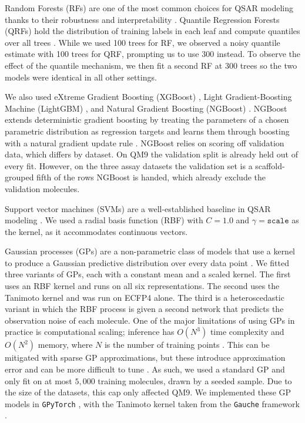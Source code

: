 Random Forests (RFs) are one of the most common choices for QSAR modeling thanks to their robustness and interpretability \citep{Svetnik2003}. Quantile Regression Forests (QRFs) hold the distribution of training labels in each leaf and compute quantiles over all trees \citep{Meinshausen2006}. While we used 100 trees for RF, we observed a noisy quantile estimate with 100 trees for QRF, prompting us to use 300 instead. To observe the effect of the quantile mechanism, we then fit a second RF at 300 trees so the two models were identical in all other settings. 

We also used eXtreme Gradient Boosting (XGBoost) \citep{Chen2016}, Light Gradient-Boosting Machine (LightGBM) \citep{ke2017lightgbm}, and Natural Gradient Boosting (NGBoost) \citep{Duan2020}. NGBoost extends deterministic gradient boosting by treating the parameters of a chosen parametric distribution as regression targets and learns them through boosting with a natural gradient update rule \citep{Duan2020}. NGBoost relies on scoring off validation data, which differs by dataset. On QM9 the validation split is already held out of every fit. However, on the three assay datasets the validation set is a scaffold-grouped fifth of the rows NGBoost is handed, which already exclude the validation molecules. 

Support vector machines (SVMs) are a well-established baseline in QSAR modeling \citep{Vapnik1995, Svetnik2003}. We used a radial basis function (RBF) with $C = 1.0$ and $\gamma = \texttt{scale}$ as the kernel, as it accommodates continuous vectors. 

Gaussian processes (GPs) are a non-parametric class of models that use a kernel to produce a Gaussian predictive distribution over every data point \citep{Obrezanova2007, Rasmussen2005}. We fitted three variants of GPs, each with a constant mean and a scaled kernel. The first uses an RBF kernel and runs on all six representations. The second uses the Tanimoto kernel \citep{Ralaivola2005, moss2020} and was run on ECFP4 alone. The third is a heteroscedastic variant in which the RBF process is given a second network that predicts the observation noise of each molecule. One of the major limitations of using GPs in practice is computational scaling; inference has $O(N^3)$ time complexity and $O(N^2)$ memory, where $N$ is the number of training points \citep{Rasmussen2005}. This can be mitigated with sparse GP approximations, but these introduce approximation error and can be more difficult to tune \citep{quinonero2005}. As such, we used a standard GP and only fit on at most $5{,}000$ training molecules, drawn by a seeded sample. Due to the size of the datasets, this cap only affected QM9. We implemented these GP models in \texttt{GPyTorch} \citep{gpytorch}, with the Tanimoto kernel taken from the \texttt{Gauche} framework \citep{gauche}.

